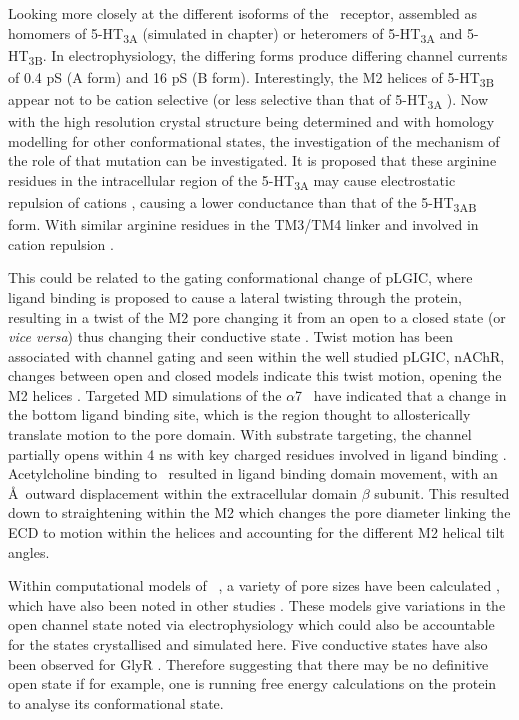 Looking more closely at the different isoforms of the \HT\ receptor, assembled as homomers of 5-HT\textsubscript{3A} (simulated in chapter) or heteromers of 5-HT\textsubscript{3A} and 5-HT\textsubscript{3B}. In electrophysiology, the differing forms produce differing channel currents of 0.4 pS (A form) \cite{Brown1998,Hussy1994} and 16 pS \cite{Davies1999} (B form). Interestingly, the M2 helices of 5-HT\textsubscript{3B} appear not to be cation selective (or less selective than that of 5-HT\textsubscript{3A} \cite{Davies1999}). Now with the high resolution crystal structure being determined and with homology modelling for other conformational states, the investigation of the mechanism of the role of that mutation can be investigated. It is proposed that these arginine residues in the intracellular region of the 5-HT\textsubscript{3A} may cause electrostatic repulsion of cations \cite{Kozuska2013}, causing a lower conductance than that of the 5-HT\textsubscript{3AB} form. With similar arginine residues in the TM3/TM4 linker \cite{Kelley2003} and involved in cation repulsion \cite{Kozuska2013}.

This could be related to the gating conformational change of pLGIC, where ligand binding is proposed to cause a lateral twisting through the protein, resulting in a twist of the M2 pore changing it from an open to a closed state (or \textit{vice versa}) thus changing their conductive state \cite{Sansom1995,Unwin1995,Lynch1997}. Twist motion has been associated with channel gating \cite{Taly2005,Taly2006} and seen within the well studied pLGIC, nAChR, changes between open and closed models indicate this twist motion, opening the M2 helices \cite{Haddadian2008}.  Targeted MD simulations of the $\alpha$7 \na\ have indicated that a change in the bottom ligand binding site, which is the region thought to allosterically translate motion to the pore domain. With substrate targeting, the channel partially opens within 4 ns with key charged residues involved in ligand binding \cite{Cheng2006}. Acetylcholine binding to \na\ resulted in ligand binding domain movement, with an  \AA\ outward displacement within the extracellular domain $\beta$ subunit. This resulted down to straightening within the M2 which changes the pore diameter \cite{Unwin2012} linking the ECD to motion within the helices and accounting for the different M2 helical tilt angles.

Within computational models of \gl\ , a variety of pore sizes have been calculated \cite{Cheng2012}, which have also been noted in other studies \cite{Keramidas2002,Keramidas2000,Cymes2011b}. These models give variations in the open channel state noted via electrophysiology which could also be accountable for the states crystallised and simulated here. Five conductive states have also been observed for GlyR \cite{Lynch2004}. Therefore suggesting that there may be no definitive open state if for example, one is running free energy calculations on the protein to analyse its conformational state. 

